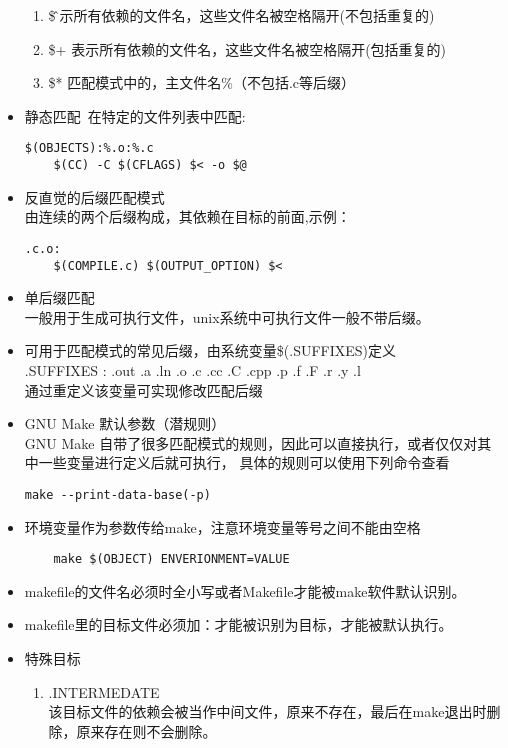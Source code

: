 \begin{itemize}
\begin{enumerate}
			\item \$\^
			表示所有依赖的文件名，这些文件名被空格隔开(不包括重复的)
			\item \$+
			表示所有依赖的文件名，这些文件名被空格隔开(包括重复的)
			\item \$*
			匹配模式中的，主文件名\%（不包括.c等后缀）
		\end{enumerate}
		\item 静态匹配\
		在特定的文件列表中匹配:
\begin{lstlisting}
$(OBJECTS):%.o:%.c
	$(CC) -C $(CFLAGS) $< -o $@
\end{lstlisting}
		\item 反直觉的后缀匹配模式\\
		由连续的两个后缀构成，其依赖在目标的前面,示例：
\begin{lstlisting}
.c.o:
	$(COMPILE.c) $(OUTPUT_OPTION) $< 
\end{lstlisting}
		\item 单后缀匹配\\
		一般用于生成可执行文件，unix系统中可执行文件一般不带后缀。
		\item 可用于匹配模式的常见后缀，由系统变量\$(.SUFFIXES)定义\\
		.SUFFIXES : .out .a .ln .o .c .cc .C .cpp .p .f .F .r .y .l \\
		通过重定义该变量可实现修改匹配后缀
		\item GNU Make 默认参数（潜规则）\\
		GNU Make 自带了很多匹配模式的规则，因此可以直接执行，或者仅仅对其中一些变量进行定义后就可执行，
		具体的规则可以使用下列命令查看
\begin{lstlisting}
make --print-data-base(-p)
\end{lstlisting}
		\item 环境变量作为参数传给make，注意环境变量等号之间不能由空格
\begin{lstlisting}
	make $(OBJECT) ENVERIONMENT=VALUE
\end{lstlisting}
		\item makefile的文件名必须时全小写或者Makefile才能被make软件默认识别。
		\item makefile里的目标文件必须加：才能被识别为目标，才能被默认执行。
		\item 特殊目标\\
			\begin{enumerate}
				\item .INTERMEDATE \\
				该目标文件的依赖会被当作中间文件，原来不存在，最后在make退出时删除，原来存在则不会删除。

\end{enumerate}
\end{itemize}
